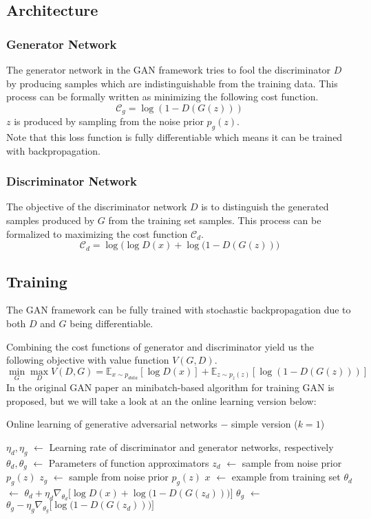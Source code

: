 \documentclass[twoside,11pt,a4paper]{article}
\newcommand*\Let[2]{\State #1 $\gets$ #2}
\theoremstyle{break}
\begin{document}
\subsection{Architecture}
\label{sub:gan_arch}


\subsubsection{Generator Network}
The generator network in the GAN framework tries to fool the discriminator $D$ by producing samples which are indistinguishable from the training data.
This process can be formally written as minimizing the following cost function.
$$
\mathcal{C}_g = \log(1 - D(G(z)))
$$
$z$ is produced by sampling from the noise prior $p_g(z)$.\\

Note that this loss function is fully differentiable which means it can be trained with backpropagation.



\subsubsection{Discriminator Network}
The objective of the discriminator network $D$ is to distinguish the generated samples produced by $G$ from the training set samples.
This process can be formalized to maximizing the cost function $\mathcal{C}_d$.
$$
\mathcal{C}_d = \log\big(\log D(x) + \log (1 - D(G(z))\big)
$$



\subsection{Training}
\label{sub:gan_training}
The GAN framework can be fully trained with stochastic backpropagation due to both $D$ and $G$ being differentiable.

Combining the cost functions of generator and discriminator yield us the following objective with value function $V(G,D)$.
$$
\min_G \max_D V(D,G) = \mathbb{E}_{x \sim p_{data}}[\log D(x)] + \mathbb{E}_{z \sim p_z(z)}[\log(1 - D(G(z)))]
$$
In the original GAN paper an minibatch-based algorithm for training GAN is proposed, but we will take a look at an the online learning version below:\\
\begin{algorithm}
  \caption{Online learning of generative adversarial networks $-$ simple version ($k=1$)}
  \label{alg:gan_online}
  \begin{algorithmic}[1]
    \Let{$\eta_d, \eta_g$}{Learning rate of discriminator and generator networks, respectively}
    \Let{$\theta_d, \theta_g$}{Parameters of function approximators}
      \Let{$z_d$}{sample from noise prior $p_g(z)$}
      \Let{$z_g$}{sample from noise prior $p_g(z)$}
      \Let{$x$}{example from training set}
      \Let{$\theta_d$}{$\theta_d + \eta_d \nabla_{\theta_d} \bigg[\log D(x) + \log \big(1 - D(G(z_d))\big)\bigg]$}
      \Let{$\theta_g$}{$\theta_g - \eta_g \nabla_{\theta_g} \bigg[\log\big(1 - D(G(z_d))\big)\bigg]$}
    \EndFor
  \end{algorithmic}
\end{algorithm}
\end{document}
